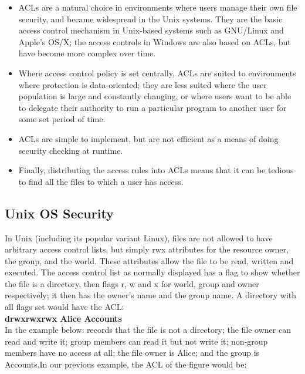 			\begin{itemize}
				\item ACLs are a natural choice in environments where users manage their
				own file security, and became widespread in the Unix systems. They are 
				the basic access control mechanism in Unix-based systems such as GNU/Linux and Apple’s OS/X; the access controls in Windows are also based on ACLs, 
				but have become more complex over time. 
				\item Where access control policy is set centrally, ACLs
				are suited to environments where protection is data-oriented; they are less
				suited where the user population is large and constantly changing, or where
				users want to be able to delegate their authority to run a particular program
				to another user for some set period of time. 
				\item ACLs are simple to implement, but are not efficient as a means of doing security checking at runtime.
				\item Finally, distributing the access rules into ACLs means that it can be tedious
				to find all the files to which a user has access.
			\end{itemize}

		\subsection{Unix OS Security}

			In Unix (including its popular variant Linux), files are not allowed to have
			arbitrary access control lists, but simply rwx attributes for the resource owner,
			the group, and the world. These attributes allow the file to be read, written
			and executed. The access control list as normally displayed has a flag to show
			whether the file is a directory, then flags r, w and x for world, group and owner
			respectively; it then has the owner’s name and the group name. A directory
			with all flags set would have the ACL: \\

				{\bf \color{blue} drwxrwxrwx Alice Accounts} \\


			In the example below: records that the file is not a directory; the file owner can 
			read and write it; group members can read it but not write it; non-group members have 
			no access at all; the file owner is Alice; and the group is Accounts.In our previous example, the ACL of the figure would be: \\

